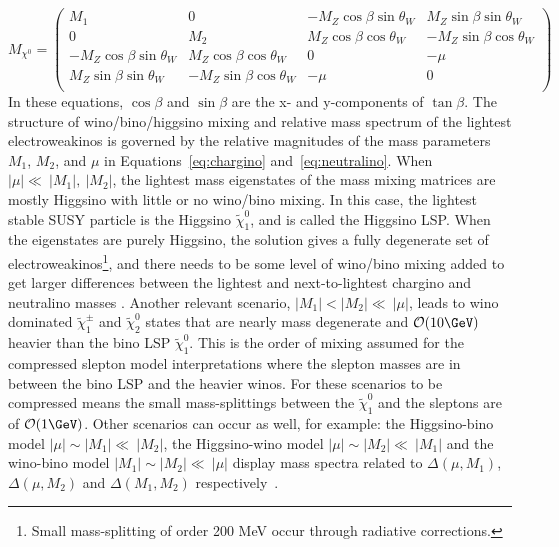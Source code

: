 \begin{equation}
M_{\chi^0}=
\begin{pmatrix}
M_1 & 0 & -M_Z\cos\beta \sin\theta_W & M_Z\sin\beta \sin\theta_W\\
0 & M_2 & M_Z\cos\beta \cos\theta_W & -M_Z\sin\beta \cos\theta_W\\
-M_Z\cos\beta \sin\theta_W & M_Z\cos\beta \cos\theta_W & 0 & -\mu \\
M_Z\sin\beta \sin\theta_W & -M_Z\sin\beta \cos\theta_W & -\mu & 0 \\
\end{pmatrix}
\label{eq:neutralino}
\end{equation}
In these equations, $\cos\beta$ and $\sin\beta$ are the x- and y-components of $\tan\beta$.  The structure of wino/bino/higgsino mixing and relative mass spectrum of the lightest electroweakinos is governed by the relative magnitudes of the mass parameters $M_1$, $M_2$, and $\mu$ in Equations~\ref{eq:chargino} and~\ref{eq:neutralino}.  When $|\mu|\ll~|M_1|,~|M_2|$, the lightest mass eigenstates of the mass mixing matrices are mostly Higgsino with little or no wino/bino mixing.  In this case, the lightest stable SUSY particle is the Higgsino $\tilde\chi_1^0$, and is called the Higgsino LSP.  When the eigenstates are purely Higgsino, the solution gives a fully degenerate set of electroweakinos\footnote{Small mass-splitting of order 200 MeV occur through radiative corrections.}, and there needs to be some level of wino/bino mixing added to get larger differences between the lightest and next-to-lightest chargino and neutralino masses \cite{PhysRevD.93.063525}.  Another relevant scenario, $|M_1| <|M_2|\ll~|\mu|$, leads to wino dominated $\tilde\chi_1^\pm$ and $\tilde\chi_2^0$ states that are nearly mass degenerate and $\mathcal{O}(10\GeV)$ heavier than the bino LSP $\tilde\chi_1^0$.  This is the order of mixing assumed for the compressed slepton model interpretations where the slepton masses are in between the bino LSP and the heavier winos.  For these scenarios to be compressed means the small mass-splittings between the $\tilde\chi_1^0$ and the sleptons are of $\mathcal{O}(1\GeV)$.  Other scenarios can occur as well, for example: the Higgsino-bino model $|\mu|\sim |M_1|\ll~|M_2|$, the Higgsino-wino model $|\mu|\sim |M_2|\ll~|M_1|$ and the wino-bino model $|M_1|\sim |M_2|\ll~|\mu|$ display mass spectra related to $\Delta(\mu, M_1)$, $\Delta(\mu, M_2)$ and $\Delta(M_1, M_2)$ respectively~\cite{PhysRevD.96.055018}.  


